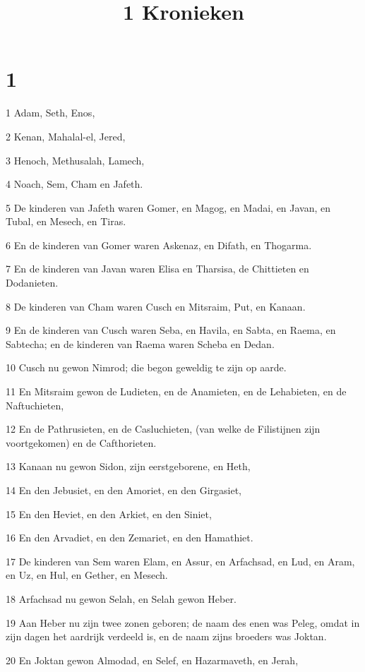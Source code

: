 

\title{1 Kronieken}



\chapter{1}

\par 1 Adam, Seth, Enos,
\par 2 Kenan, Mahalal-el, Jered,
\par 3 Henoch, Methusalah, Lamech,
\par 4 Noach, Sem, Cham en Jafeth.
\par 5 De kinderen van Jafeth waren Gomer, en Magog, en Madai, en Javan, en Tubal, en Mesech, en Tiras.
\par 6 En de kinderen van Gomer waren Askenaz, en Difath, en Thogarma.
\par 7 En de kinderen van Javan waren Elisa en Tharsisa, de Chittieten en Dodanieten.
\par 8 De kinderen van Cham waren Cusch en Mitsraim, Put, en Kanaan.
\par 9 En de kinderen van Cusch waren Seba, en Havila, en Sabta, en Raema, en Sabtecha; en de kinderen van Raema waren Scheba en Dedan.
\par 10 Cusch nu gewon Nimrod; die begon geweldig te zijn op aarde.
\par 11 En Mitsraim gewon de Ludieten, en de Anamieten, en de Lehabieten, en de Naftuchieten,
\par 12 En de Pathrusieten, en de Casluchieten, (van welke de Filistijnen zijn voortgekomen) en de Cafthorieten.
\par 13 Kanaan nu gewon Sidon, zijn eerstgeborene, en Heth,
\par 14 En den Jebusiet, en den Amoriet, en den Girgasiet,
\par 15 En den Heviet, en den Arkiet, en den Siniet,
\par 16 En den Arvadiet, en den Zemariet, en den Hamathiet.
\par 17 De kinderen van Sem waren Elam, en Assur, en Arfachsad, en Lud, en Aram, en Uz, en Hul, en Gether, en Mesech.
\par 18 Arfachsad nu gewon Selah, en Selah gewon Heber.
\par 19 Aan Heber nu zijn twee zonen geboren; de naam des enen was Peleg, omdat in zijn dagen het aardrijk verdeeld is, en de naam zijns broeders was Joktan.
\par 20 En Joktan gewon Almodad, en Selef, en Hazarmaveth, en Jerah,
